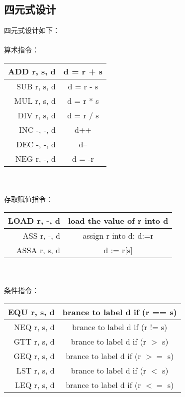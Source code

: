 \subsection{四元式设计}
四元式设计如下：\\
\vbox{}\\
算术指令：\\
\begin{tabular}{r|c}
        \hline
        ADD  r, s, d & d = r + s \\ \hline
        SUB  r, s, d & d = r - s \\ \hline
        MUL  r, s, d & d = r * s \\ \hline
        DIV  r, s, d & d = r / s \\ \hline
        INC  -, -, d & d++       \\ \hline
        DEC  -, -, d & d--       \\ \hline
        NEG  r, -, d & d = -r    \\ \hline
\end{tabular} \\
\vbox{}\\
存取赋值指令：\\
\begin{tabular}{r|c}
        \hline
        LOAD  r, -, d & load the value of r into d \\ \hline
        ASS   r, -, d & assign r into d; d:=r \\ \hline
        ASSA  r, s, d & d := r[s] \\ \hline
\end{tabular} \\
\vbox{}\\
条件指令：\\
\begin{tabular}{r|c}
        \hline
        EQU  r, s, d & brance to label d if (r == s) \\ \hline
        NEQ  r, s, d & brance to label d if (r != s) \\ \hline
        GTT  r, s, d & brance to label d if (r $>$ s)\\ \hline
        GEQ  r, s, d & brance to label d if (r $>=$ s)\\ \hline
        LST  r, s, d & brance to label d if (r $<$ s) \\ \hline
        LEQ  r, s, d & brance to label d if (r $<=$ s)\\ \hline
\end{tabular} \\
\vbox{}\\
